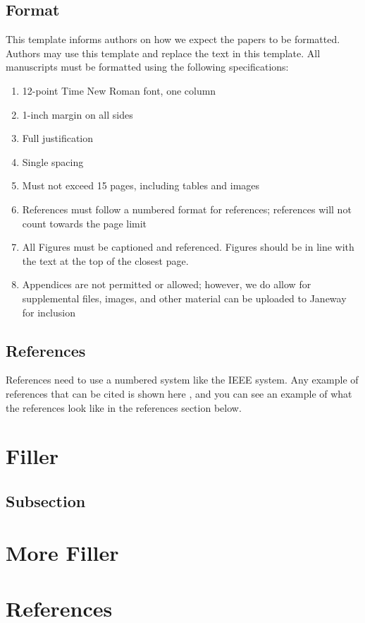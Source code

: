 \documentclass[12pt]{sba}
\begin{document}
\subsection*{Format}

This template informs authors on how we expect the papers to be formatted.  Authors may use this template and replace the text in this template. All manuscripts must be formatted using the following specifications:

\begin{enumerate}
    \item 12-point Time New Roman font, one column
    \item 1-inch margin on all sides
    \item Full justification
    \item Single spacing
    \item Must not exceed 15 pages, including tables and images
    \item References must follow a numbered format for references; references will not count towards the page limit
    \item All Figures must be captioned and referenced. Figures should be in line with the text at the top of the closest page.
    \item Appendices are not permitted or allowed; however, we do allow for supplemental files, images, and other material can be uploaded to Janeway for inclusion
\end{enumerate}

\subsection*{References}

References need to use a numbered system like the IEEE system. Any example of references that can be cited \cite{Nelson2009} is shown here \cite{Nelson2013}, and you can see an example \cite{Nelson2014} of what the references look like in the references section below.

\section*{Filler}
\lipsum

\subsection*{Subsection}
\lipsum

\section*{More Filler}
\lipsum

\newpage
\section*{References}

\end{document}
